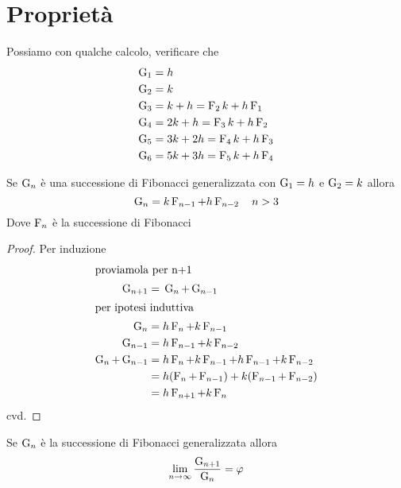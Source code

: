 \section{Proprietà}
Possiamo con qualche calcolo, verificare che
\begin{align*}
\Gib{1}={}&h\\
\Gib{2}={}&k\\
\Gib{3}={}&k+h=\Fib{2}k+h\Fib{1}\\
\Gib{4}={}&2k+h=\Fib{3}k+h\Fib{2}\\
\Gib{5}={}&3k+2h=\Fib{4}k+h\Fib{3}\\
\Gib{6}={}&5k+3h=\Fib{5}k+h\Fib{4}
\end{align*} 
\begin{thm}[Derivazione]
	Se $\Gib{n}$ è una successione di Fibonacci generalizzata  con $\Gib{1}=h$ e $\Gib{2}=k $ allora
	\begin{equation}
		\Gib{n}=k\Fib{n-1}+h\Fib{n-2}\quad n>3
	\end{equation}\label{thm:FibGenDer}
	Dove $\Fib{n}$ è la successione di Fibonacci
\end{thm}
\begin{proof}
Per induzione
\begin{align*}
\intertext{proviamola per n+1}
		\Gib{n+1}={}&\Gib{n}+\Gib{n-1}\\
\intertext{per ipotesi induttiva}
\Gib{n}={}&h\Fib{n}+k\Fib{n-1}\\
\Gib{n-1}={}&h\Fib{n-1}+k\Fib{n-2}\\
\Gib{n}+\Gib{n-1}={}&h\Fib{n}+k\Fib{n-1}+h\Fib{n-1}+k\Fib{n-2}\\
={}&h(\Fib{n}+\Fib{n-1})+k(\Fib{n-1}+\Fib{n-2})\\
={}&h\Fib{n+1}+k\Fib{n}\\
\end{align*}
cvd.
\end{proof}
\begin{thm}
	Se $\Gib{n}$ è la successione di Fibonacci generalizzata allora 
	\begin{equation}
		\lim_{n\to\infty}\dfrac{\Gib{n+1}}{\Gib{n}}=\varphi
	\end{equation}\label{eqn:FibLimRapGen}
\end{thm}
